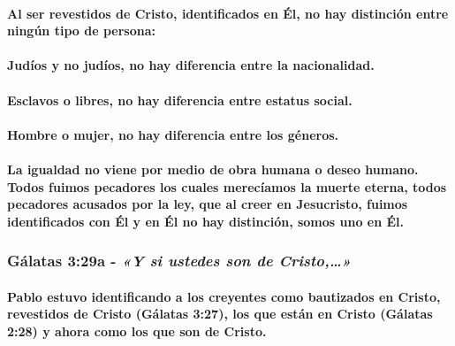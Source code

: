\documentclass[11a pt,twoside]{article}
\newcommand{\scripture}[1]{%
  {\fontsize{12pt}{16pt}\selectfont\ScriptureFont\itshape #1}%
}
\let\oldsubsubsection\subsubsection
\renewcommand{\subsubsection}{\needspace{4\baselineskip}\oldsubsubsection}
\let\oldparagraph\paragraph
\renewcommand{\paragraph}{\needspace{3\baselineskip}\oldparagraph}
\begin{document}
\paragraph{Al ser revestidos de Cristo, identificados en Él, no hay
distinción entre ningún tipo de
persona:}\label{al-ser-revestidos-de-cristo-identificados-en-uxe9l-no-hay-distinciuxf3n-entre-ninguxfan-tipo-de-persona}

\paragraph{Judíos y no judíos, no hay diferencia entre la
nacionalidad.}\label{juduxedos-y-no-juduxedos-no-hay-diferencia-entre-la-nacionalidad.}

\paragraph{Esclavos o libres, no hay diferencia entre estatus
social.}\label{esclavos-o-libres-no-hay-diferencia-entre-estatus-social.}

\paragraph{Hombre o mujer, no hay diferencia entre los
géneros.}\label{hombre-o-mujer-no-hay-diferencia-entre-los-guxe9neros.}

\paragraph{La igualdad no viene por medio de obra humana o deseo humano.
Todos fuimos pecadores los cuales merecíamos la muerte eterna, todos
pecadores acusados por la ley, que al creer en Jesucristo, fuimos
identificados con Él y en Él no hay distinción, somos uno en
Él.}\label{la-igualdad-no-viene-por-medio-de-obra-humana-o-deseo-humano.-todos-fuimos-pecadores-los-cuales-merecuxedamos-la-muerte-eterna-todos-pecadores-acusados-por-la-ley-que-al-creer-en-jesucristo-fuimos-identificados-con-uxe9l-y-en-uxe9l-no-hay-distinciuxf3n-somos-uno-en-uxe9l.}

\subsubsection{\texorpdfstring{Gálatas 3:29a -
\scripture{«Y si ustedes son de Cristo,…»}}{Gálatas 3:29a - }}\label{guxe1latas-329a---y-si-ustedes-son-de-cristo}

\paragraph{Pablo estuvo identificando a los creyentes como bautizados en
Cristo, revestidos de Cristo (Gálatas 3:27), los que están en Cristo
(Gálatas 2:28) y ahora como los que son de
Cristo.}\label{pablo-estuvo-identificando-a-los-creyentes-como-bautizados-en-cristo-revestidos-de-cristo-guxe1latas-327-los-que-estuxe1n-en-cristo-guxe1latas-228-y-ahora-como-los-que-son-de-cristo.}
\end{document}
